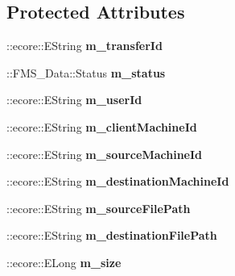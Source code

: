 \subsection*{Protected Attributes}
\begin{DoxyCompactItemize}
\item 
\hypertarget{classFMS__Data_1_1FileTransfer_a574cce5d6bcf60ac21ac6327cf82b0e8}{
::ecore::EString {\bfseries m\_\-transferId}}
\label{classFMS__Data_1_1FileTransfer_a574cce5d6bcf60ac21ac6327cf82b0e8}

\item 
\hypertarget{classFMS__Data_1_1FileTransfer_a9a52e864daa74ff8a793abf7f6c8831b}{
::FMS\_\-Data::Status {\bfseries m\_\-status}}
\label{classFMS__Data_1_1FileTransfer_a9a52e864daa74ff8a793abf7f6c8831b}

\item 
\hypertarget{classFMS__Data_1_1FileTransfer_a64f97e8a216400df8fbfe214a6b2d791}{
::ecore::EString {\bfseries m\_\-userId}}
\label{classFMS__Data_1_1FileTransfer_a64f97e8a216400df8fbfe214a6b2d791}

\item 
\hypertarget{classFMS__Data_1_1FileTransfer_a77689b29ee928a7c516f264af9d9c809}{
::ecore::EString {\bfseries m\_\-clientMachineId}}
\label{classFMS__Data_1_1FileTransfer_a77689b29ee928a7c516f264af9d9c809}

\item 
\hypertarget{classFMS__Data_1_1FileTransfer_ab0444a04ffa7a55e0fea6acb51a73e46}{
::ecore::EString {\bfseries m\_\-sourceMachineId}}
\label{classFMS__Data_1_1FileTransfer_ab0444a04ffa7a55e0fea6acb51a73e46}

\item 
\hypertarget{classFMS__Data_1_1FileTransfer_afd8c746bcb5c54b4f7d918f17abcc0f1}{
::ecore::EString {\bfseries m\_\-destinationMachineId}}
\label{classFMS__Data_1_1FileTransfer_afd8c746bcb5c54b4f7d918f17abcc0f1}

\item 
\hypertarget{classFMS__Data_1_1FileTransfer_a884e2e5b965a0810a0e5e13f7e648447}{
::ecore::EString {\bfseries m\_\-sourceFilePath}}
\label{classFMS__Data_1_1FileTransfer_a884e2e5b965a0810a0e5e13f7e648447}

\item 
\hypertarget{classFMS__Data_1_1FileTransfer_ad9f4df37cb3a5dea05c1bc190fc1802c}{
::ecore::EString {\bfseries m\_\-destinationFilePath}}
\label{classFMS__Data_1_1FileTransfer_ad9f4df37cb3a5dea05c1bc190fc1802c}

\item 
\hypertarget{classFMS__Data_1_1FileTransfer_a415ef56755bbf41cd1049226628ab7ac}{
::ecore::ELong {\bfseries m\_\-size}}
\label{classFMS__Data_1_1FileTransfer_a415ef56755bbf41cd1049226628ab7ac}


\end{DoxyCompactItemize}
